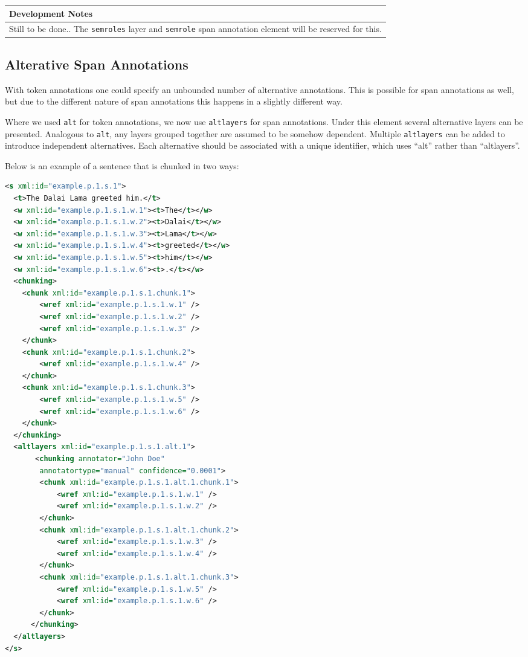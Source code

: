 \documentclass[a4paper,12pt]{report}
\newenvironment{devnotes}
{
\begin{center}
    \begin{tabular}[h!]{|p{0.8\textwidth}|}
    \hline
    {\bf Development Notes}\\\hline}
{   \\\hline
    \end{tabular}
\end{center}}
\begin{document}
\begin{devnotes}
Still to be done.. The \texttt{semroles} layer and \texttt{semrole} span annotation element will be reserved for this.
\end{devnotes}

\subsection{Alterative Span Annotations}

With token annotations one could specify an unbounded number of alternative annotations. This is possible for span annotations as well, but due to the different nature of span annotations this happens in a slightly different way.

Where we used \texttt{alt} for token annotations, we now use \texttt{altlayers} for span annotations. Under this element several alternative layers can be presented. Analogous to \texttt{alt}, any layers grouped together are assumed to be somehow dependent. Multiple \texttt{altlayers} can be added to introduce independent alternatives. Each alternative should be associated with a unique identifier, which uses ``alt'' rather than ``altlayers''. 

Below is an example of a sentence that is chunked in two ways:

\begin{lstlisting}[language=xml]
<s xml:id="example.p.1.s.1">
  <t>The Dalai Lama greeted him.</t>
  <w xml:id="example.p.1.s.1.w.1"><t>The</t></w>
  <w xml:id="example.p.1.s.1.w.2"><t>Dalai</t></w>
  <w xml:id="example.p.1.s.1.w.3"><t>Lama</t></w>
  <w xml:id="example.p.1.s.1.w.4"><t>greeted</t></w>
  <w xml:id="example.p.1.s.1.w.5"><t>him</t></w>
  <w xml:id="example.p.1.s.1.w.6"><t>.</t></w>
  <chunking>
    <chunk xml:id="example.p.1.s.1.chunk.1">       
        <wref xml:id="example.p.1.s.1.w.1" />       
        <wref xml:id="example.p.1.s.1.w.2" />       
        <wref xml:id="example.p.1.s.1.w.3" />        
    </chunk>
    <chunk xml:id="example.p.1.s.1.chunk.2">       
        <wref xml:id="example.p.1.s.1.w.4" />
    </chunk>
    <chunk xml:id="example.p.1.s.1.chunk.3">       
        <wref xml:id="example.p.1.s.1.w.5" />
        <wref xml:id="example.p.1.s.1.w.6" />
    </chunk>    
  </chunking>
  <altlayers xml:id="example.p.1.s.1.alt.1">
       <chunking annotator="John Doe" 
        annotatortype="manual" confidence="0.0001">
        <chunk xml:id="example.p.1.s.1.alt.1.chunk.1">       
            <wref xml:id="example.p.1.s.1.w.1" />       
            <wref xml:id="example.p.1.s.1.w.2" />                       
        </chunk>
        <chunk xml:id="example.p.1.s.1.alt.1.chunk.2">       
            <wref xml:id="example.p.1.s.1.w.3" />  
            <wref xml:id="example.p.1.s.1.w.4" />
        </chunk>
        <chunk xml:id="example.p.1.s.1.alt.1.chunk.3">       
            <wref xml:id="example.p.1.s.1.w.5" />
            <wref xml:id="example.p.1.s.1.w.6" />
        </chunk>    
      </chunking>   
  </altlayers>
</s>
\end{lstlisting}
\end{document}
